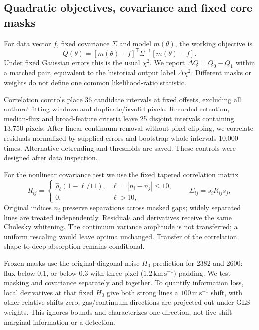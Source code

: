 \subsection{Quadratic objectives, covariance and fixed core masks}
\label{sec:covariance}
For data vector $f$, fixed covariance $\Sigma$ and model $m(\theta)$, the working objective is
\begin{equation}
 Q(\theta)=[m(\theta)-f]^{\mathsf T}\Sigma^{-1}[m(\theta)-f].
 \label{eq:objective}
\end{equation}
Under fixed Gaussian errors this is the usual $\chi^2$. We report $\Delta Q=Q_0-Q_1$ within a matched pair, equivalent to the historical output label $\Delta\chi^2$. Different masks or weights do not define one common likelihood-ratio statistic.

Correlation controls place 36 candidate intervals at fixed offsets, excluding all authors' fitting windows and duplicate/invalid pixels. Recorded retention, median-flux and broad-feature criteria leave 25 disjoint intervals containing 13,750 pixels. After linear-continuum removal without pixel clipping, we correlate residuals normalized by supplied errors and bootstrap whole intervals 10,000 times. Alternative detrending and thresholds are saved. These controls were designed after data inspection.

For the nonlinear covariance test we use the fixed tapered correlation matrix
\begin{equation}
 R_{ij}=\begin{cases}
 \widehat\rho_{\ell}(1-\ell/11),&\ell=|n_i-n_j|\leq10,\\
 0,&\ell>10,
 \end{cases}
 \qquad \Sigma_{ij}=s_iR_{ij}s_j,
 \label{eq:tapered_covariance}
\end{equation}
Original indices $n_i$ preserve separations across masked gaps; widely separated lines are treated independently. Residuals and derivatives receive the same Cholesky whitening. The continuum variance amplitude is not transferred; a uniform rescaling would leave optima unchanged. Transfer of the correlation shape to deep absorption remains conditional.

Frozen masks use the original diagonal-noise $H_0$ prediction for 2382 and 2600: flux below 0.1, or below 0.3 with three-pixel ($1.2\,\mathrm{km\,s^{-1}}$) padding. We test masking and covariance separately and together. To quantify information loss, local derivatives at that fixed $H_0$ give both strong lines a $100\,\mathrm{m\,s^{-1}}$ shift, with other relative shifts zero; gas/continuum directions are projected out under GLS weights. This ignores bounds and characterizes one direction, not five-shift marginal information or a detection.


